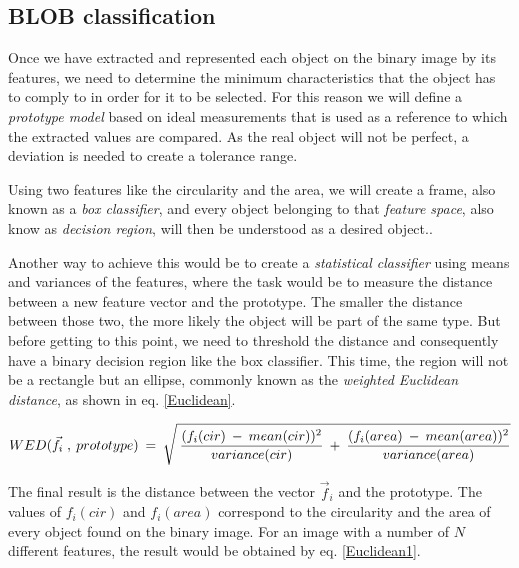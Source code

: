 
\subsection{BLOB classification}
Once we have extracted and represented each object on the binary image by its features, we need to determine the minimum characteristics that the object has to comply to in order for it to be selected. For this reason we will define a \textit{prototype model} based on ideal measurements that is used as a reference to which the extracted values are compared. As the real object will not be perfect, a deviation is needed to create a tolerance range.

Using two features like the circularity and the area, we will create a frame, also known as a \textit{box classifier}, and every object belonging to that \textit{feature space}, also know as \textit{decision region}, will then be understood as a desired object.\citep{ip_book}.

Another way to achieve this would be to create a \textit{statistical classifier} using means and variances of the features, where the task would be to measure the distance between a new feature vector and the prototype. The smaller the distance between those two, the more likely the object will be part of the same type. But before getting to this point, we need to threshold the distance and consequently have a binary decision region like the box classifier. This time, the region will not be a rectangle but an ellipse, commonly known as the \textit{weighted Euclidean distance}, as shown in eq. \ref{Euclidean}.

\begin{equation}	
	\begin{aligned}
{WED(\vec{f}_{i} \; , \: prototype)} \: = \: \sqrt{\mathstrut \:  \displaystyle\frac{(f_{i}(cir) \: - \: mean(cir))^2}{variance(cir)} \: + \: \displaystyle\frac{(f_{i}(area) \: - \: mean(area))^2}{variance(area)}}
\label{Euclidean}
	\end{aligned}
\end{equation}

The final result is the distance between the vector {$\vec{f}_{i}$} and the prototype. The values of {$f_{i}(cir)$} and {$f_{i}(area)$} correspond to the circularity and the area of every object found on the binary image. For an image with a number of {$N$} different features, the result would be obtained by eq. \ref{Euclidean1}.

